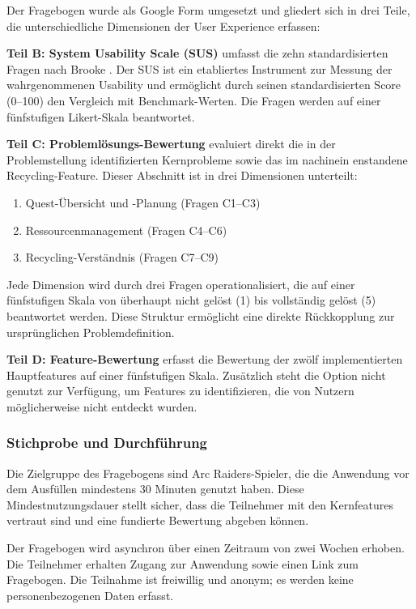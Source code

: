 Der Fragebogen wurde als Google Form umgesetzt und gliedert sich in drei Teile, die unterschiedliche Dimensionen der User Experience erfassen:

\textbf{Teil B: System Usability Scale (SUS)} umfasst die zehn standardisierten Fragen nach Brooke \cite{brooke1996sus}. Der \ac{SUS} ist ein etabliertes Instrument zur Messung der wahrgenommenen Usability und ermöglicht durch seinen standardisierten Score (0--100) den Vergleich mit Benchmark-Werten. Die Fragen werden auf einer fünfstufigen Likert-Skala beantwortet.

\textbf{Teil C: Problemlösungs-Bewertung} evaluiert direkt die in der Problemstellung identifizierten Kernprobleme sowie das im nachinein enstandene Recycling-Feature. Dieser Abschnitt ist in drei Dimensionen unterteilt:
\begin{enumerate}
    \item Quest-Übersicht und -Planung (Fragen C1--C3)
    \item Ressourcenmanagement (Fragen C4--C6)
    \item Recycling-Verständnis (Fragen C7--C9)
\end{enumerate}

Jede Dimension wird durch drei Fragen operationalisiert, die auf einer fünfstufigen Skala von \glqq überhaupt nicht gelöst\grqq{} (1) bis \glqq vollständig gelöst\grqq{} (5) beantwortet werden. Diese Struktur ermöglicht eine direkte Rückkopplung zur ursprünglichen Problemdefinition.

\textbf{Teil D: Feature-Bewertung} erfasst die Bewertung der zwölf implementierten Hauptfeatures auf einer fünfstufigen Skala. Zusätzlich steht die Option \glqq nicht genutzt\grqq{} zur Verfügung, um Features zu identifizieren, die von Nutzern möglicherweise nicht entdeckt wurden.

\subsubsection{Stichprobe und Durchführung}

Die Zielgruppe des Fragebogens sind Arc Raiders-Spieler, die die Anwendung vor dem Ausfüllen mindestens 30 Minuten genutzt haben. Diese Mindestnutzungsdauer stellt sicher, dass die Teilnehmer mit den Kernfeatures vertraut sind und eine fundierte Bewertung abgeben können.

Der Fragebogen wird asynchron über einen Zeitraum von zwei Wochen erhoben. Die Teilnehmer erhalten Zugang zur Anwendung sowie einen Link zum Fragebogen. Die Teilnahme ist freiwillig und anonym; es werden keine personenbezogenen Daten erfasst.

